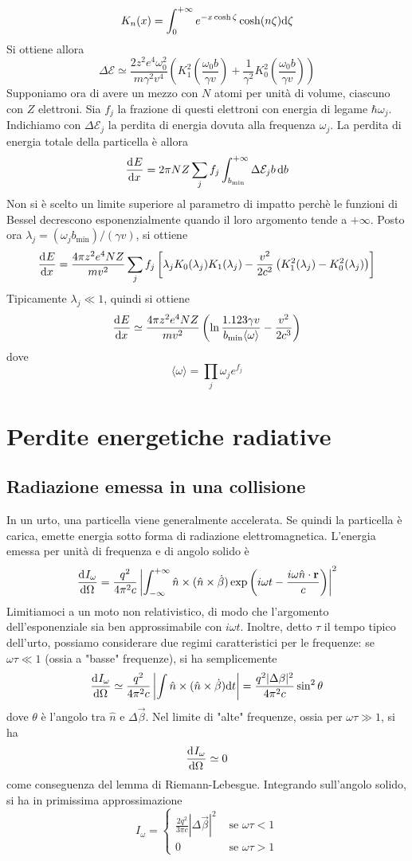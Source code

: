 \documentclass{article}
\begin{document}
\[K_n(x)=\int_{0}^{+\infty}e^{-x\cosh \zeta}\cosh(n\zeta)\mathrm{d} \zeta\]
Si ottiene allora
\[\Delta\mathcal{E}\simeq\frac{2z^2e^4\omega_0^2}{m\gamma^2v^4}\left(K_1^2\left(\frac{\omega_0 b}{\gamma v}\right)+\frac{1}{\gamma^2}K_0^2\left(\frac{\omega_0 b}{\gamma v}\right)\right)\]
Supponiamo ora di avere un mezzo con $N$ atomi per unità di volume, ciascuno con $Z$ elettroni. Sia $f_j$ la frazione di questi elettroni con energia di legame $\hbar\omega_j$. Indichiamo con $\Delta\mathcal{E}_j$ la perdita di energia dovuta alla frequenza $\omega_j$. La perdita di energia totale della particella è allora
\[\dfrac{\mathrm{d} ^{}E}{\mathrm{d} {x}^{}}=2\pi NZ\sum_{j}f_j\int_{b_\textrm{min}}^{+\infty}\Delta\mathcal{E}_j b\,\mathrm{d} b\]
Non si è scelto un limite superiore al parametro di impatto perchè le funzioni di Bessel decrescono esponenzialmente quando il loro argomento tende a $+\infty$. Posto ora $\lambda_j=(\omega_jb_\textrm{min})/(\gamma v)$, si ottiene
\[\dfrac{\mathrm{d} ^{}E}{\mathrm{d} {x}^{}}=\frac{4\pi z^2e^4NZ}{mv^2}\sum_{j}f_j\left[\lambda_jK_0(\lambda_j)K_1(\lambda_j)-\frac{v^2}{2c^2}\left(K_1^2(\lambda_j)-K_0^2(\lambda_j)\right)\right]\]
Tipicamente $\lambda_j\ll1$, quindi si ottiene
\[\dfrac{\mathrm{d} ^{}E}{\mathrm{d} {x}^{}}\simeq\frac{4\pi z^2e^4NZ}{mv^2}\left(\ln \frac{1.123\gamma v}{b_\textrm{min}\langle\omega\rangle}-\frac{v^2}{2c^3}\right)\]
dove
\[\langle\omega\rangle=\prod_j\omega_je^{f_j}\]
\section{Perdite energetiche radiative}
\subsection{Radiazione emessa in una collisione}
In un urto, una particella viene generalmente accelerata. Se quindi la particella è carica, emette energia sotto forma di radiazione elettromagnetica. L'energia emessa per unità di frequenza e di angolo solido è
\[\dfrac{\mathrm{d} ^{}I_\omega}{\mathrm{d} {\Omega}^{}}=\frac{q^2}{4\pi^2c}\left|\int_{-\infty}^{+\infty}\hat{n}\times(\hat{n}\times\dot{\mathbf\beta})\exp\left(i\omega t-\frac{i\omega\hat{n}\cdot\mathbf{r}}{c}\right)\right|^2\]
Limitiamoci a un moto non relativistico, di modo che l'argomento dell'esponenziale sia ben approssimabile con $i\omega t$. Inoltre, detto $\tau$ il tempo tipico dell'urto, possiamo considerare due regimi caratteristici per le frequenze: se $\omega\tau\ll1$ (ossia a "basse" frequenze), si ha semplicemente
\[\dfrac{\mathrm{d} ^{}I_\omega}{\mathrm{d} {\Omega}^{}}\simeq\frac{q^2}{4\pi^2 c}\left|\int\hat{n}\times(\hat{n}\times\dot{\mathbf\beta})\mathrm{d} t\right|=\frac{q^2|\Delta\mathbf{\beta}|^2}{4\pi^2 c}\sin^2\theta\]
dove $\theta$ è l'angolo tra $\hat{n}$ e $\Delta\vec{\beta}$. Nel limite di "alte" frequenze, ossia per $\omega\tau\gg1$, si ha
\[\dfrac{\mathrm{d} ^{}I_\omega}{\mathrm{d} {\Omega}^{}}\simeq0\]
come conseguenza del lemma di Riemann-Lebesgue. Integrando sull'angolo solido, si ha in primissima approssimazione
\[I_\omega=\begin{cases}
\frac{2q^2}{3\pi c}|\Delta\vec{\beta}|^2&\textrm{ se }\omega\tau<1\\0&\textrm{ se }\omega\tau>1
\end{cases}\]
\end{document}
